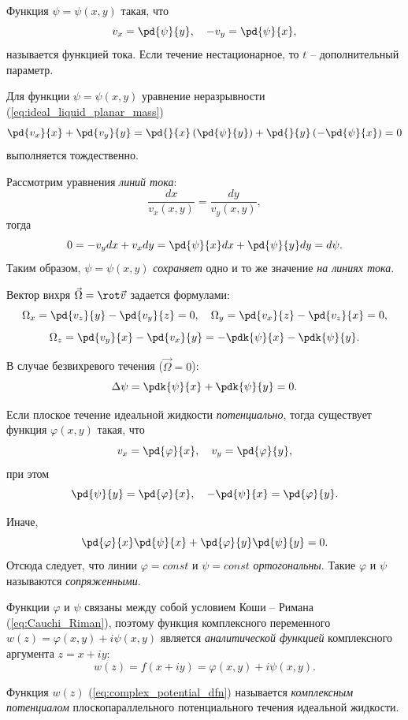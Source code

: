 \documentclass[a4paper, 14pt]{extarticle}
\begin{document}
\begin{dfn}
	Функция $\psi=\psi(x,y)$ такая, что 
	\[
	v_x = \pd{\psi}{y},\quad
	-v_y = \pd{\psi}{x},
	\]
	называется функцией тока. Если течение нестационарное, то $t$ -- дополнительный параметр.
\end{dfn}

Для функции $\psi = \psi(x,y)$ уравнение неразрывности (\ref{eq:ideal_liquid_planar_mass})
\[
	\pd{v_x}{x} + \pd{v_y}{y} = 
	\pd{}{x} \left( \pd{\psi}{y} \right) + \pd{}{y} \left( -\pd{\psi}{x} \right) = 0
\]
выполняется тождественно.


Рассмотрим уравнения \textit{линий тока}:
\[
	\frac{dx}{v_x(x,y)} = \frac{dy}{v_y(x,y)},
\]
тогда
\[
0 = -v_y dx + v_x dy = \pd{\psi}{x} dx + \pd{\psi}{y} dy =  d\psi.
\]
Таким образом, $\psi=\psi(x,y)$ \textit{сохраняет} одно и то же значение \textit{на линиях тока}.
		
Вектор вихря $\vec{\Omega}= \rot \vec{v}$ задается формулами:
\[
	\Omega_x = \pd{v_z}{y}-\pd{v_y}{z} = 0,\quad
	\Omega_y = \pd{v_x}{z}-\pd{v_z}{x} = 0,
\]
\[
	\Omega_z = \pd{v_y}{x}-\pd{v_x}{y} = -\pdk{\psi}{x} - \pdk{\psi}{y}.
\]
		
В случае безвихревого течения ($\vec{\Omega} = 0$):
\[
	\Delta \psi = \pdk{\psi}{x} + \pdk{\psi}{y} = 0.
\]


Если плоское течение идеальной жидкости \textit{потенциально}, тогда существует функция $\varphi(x,y)$ такая, что
\[
	v_x = \pd{\varphi}{x},\quad
	v_y = \pd{\varphi}{y}, 
\]
при этом
\begin{equation}
	\label{eq:Cauchi_Riman}
	\pd{\psi}{y} = \pd{\varphi}{x},\quad
	-\pd{\psi}{x} = \pd{\varphi}{y}.
\end{equation}
	
Иначе,
\[
\pd{\varphi}{x}\pd{\psi}{x} + \pd{\varphi}{y}\pd{\psi}{y} = 0.
\]
Отсюда следует, что линии $\varphi=const$ и $\psi=const$ \textit{ортогональны}. Такие $\varphi$ и $\psi$ называются \textit{сопряженными}.
		
	
Функции $\varphi$ и $\psi$ связаны между собой условием Коши -- Римана (\ref{eq:Cauchi_Riman}), поэтому функция комплексного переменного $w(z) = \varphi(x,y) + i \psi(x,y)$ является \textit{аналитической функцией} комплексного аргумента $z = x + i y$:
\begin{equation}
	\label{eq:complex_potential_dfn}
	w(z) = f(x+iy) = \varphi(x,y) + i  \psi(x,y).
\end{equation}

\begin{dfn}
	Функция $w(z)$ (\ref{eq:complex_potential_dfn}) называется \textit{комплексным потенциалом} плоскопараллельного потенциального течения идеальной жидкости.
\end{dfn}			
		
\end{document}
